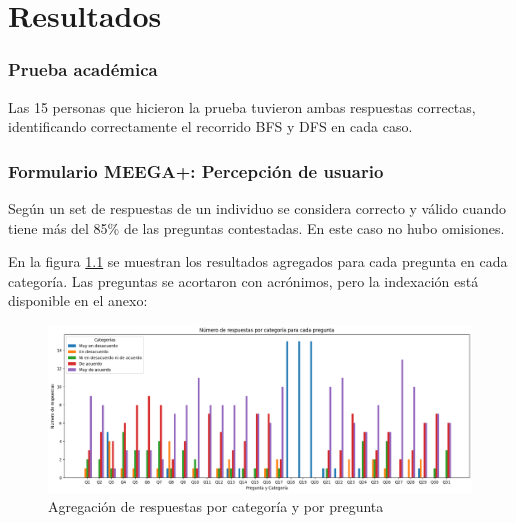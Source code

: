 \chapter{Resultados}

\subsection{Prueba académica}

Las 15 personas que hicieron la prueba tuvieron ambas respuestas correctas, identificando correctamente el recorrido BFS y DFS en cada caso.


\subsection{Formulario MEEGA+: Percepción de usuario}

Según \cite{meegaplus} un set de respuestas de un individuo se considera correcto y válido cuando tiene más del 85\% de las preguntas contestadas. En este caso no hubo omisiones.

En la figura \ref{RespuestasAgregadas} se muestran los resultados agregados para cada pregunta en cada categoría. Las preguntas se acortaron con acrónimos, pero la indexación está disponible en el anexo: 

\begin{figure}[h]
	\centering
	\includegraphics[scale=.5]{imagenes/answers.png}
	\caption{Agregación de respuestas por categoría y por pregunta}
	\label{RespuestasAgregadas}
\end{figure}

